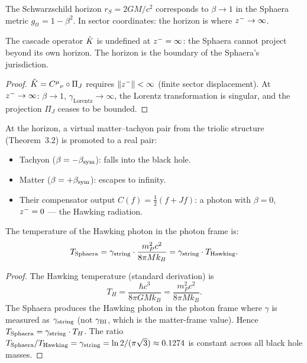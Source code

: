 \begin{definition}
The Schwarzschild horizon $r_S=2GM/c^2$ corresponds to $\beta\to 1$ in
the Sphaera metric $g_{tt}=1-\beta^2$.
In sector coordinates: the horizon is where $z^-\to\infty$.
\end{definition}

\begin{proposition}
\label{prop:horizon-cascade-singularity}
The cascade operator $\hat{K}$ is undefined at $z^-=\infty$: the Sphaera
cannot project beyond its own horizon.
The horizon is the boundary of the Sphaera's jurisdiction.
\begin{proof}
$\hat{K}=C^\mu{}_\nu\circ\Pi_J$ requires $\|z^-\|<\infty$
(finite sector displacement).
At $z^-\to\infty$: $\beta\to 1$, $\gamma_{\mathrm{Lorentz}}\to\infty$,
the Lorentz transformation is singular, and the projection $\Pi_J$ ceases
to be bounded.
\end{proof}
\end{proposition}

\begin{theorem}
\label{thm:hawking-triolic}
At the horizon, a virtual matter--tachyon pair from the triolic structure
(Theorem~3.2) is promoted to a real pair:
\begin{itemize}
  \item Tachyon ($\beta=-\beta_{\mathrm{sym}}$): falls into the black hole.
  \item Matter ($\beta=+\beta_{\mathrm{sym}}$): escapes to infinity.
  \item Their compensator output $C(f)=\tfrac{1}{2}(f+Jf)$: a photon
        with $\beta=0$, $z^-=0$ --- the Hawking radiation.
\end{itemize}
The temperature of the Hawking photon in the photon frame is:
\[
  T_{\mathrm{Sphaera}}
  = \gamma_{\mathrm{string}}\cdot\frac{m_P^2 c^2}{8\pi M k_B}
  = \gamma_{\mathrm{string}}\cdot T_{\mathrm{Hawking}}.
\]
\end{theorem}

\begin{proof}
The Hawking temperature (standard derivation) is
\[
T_H = \frac{\hbar c^3}{8\pi G M k_B} = \frac{m_P^2 c^2}{8\pi M k_B}.
\]
The Sphaera produces the Hawking photon in the photon frame where
$\gamma$ is measured as $\gamma_{\mathrm{string}}$ (not $\gamma_{\mathrm{BI}}$, which is the
matter-frame value).
Hence $T_{\mathrm{Sphaera}} = \gamma_{\mathrm{string}}\cdot T_H$.
The ratio $T_{\mathrm{Sphaera}}/T_{\mathrm{Hawking}}=\gamma_{\mathrm{string}}
=\ln 2/(\pi\sqrt{3})\approx 0.1274$ is constant across all black hole
masses.
\end{proof}

